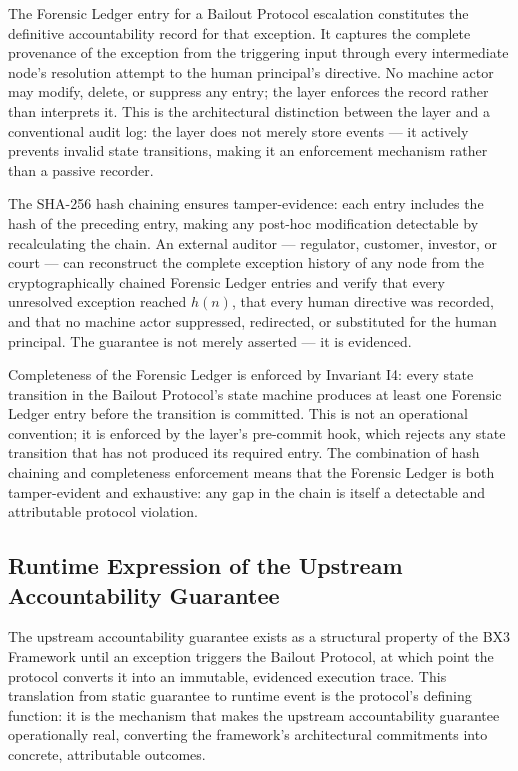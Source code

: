 The Forensic Ledger entry for a Bailout Protocol escalation constitutes the
definitive accountability record for that exception.  It captures the complete
provenance of the exception from the triggering input through every
intermediate node's resolution attempt to the human principal's directive.
No machine actor may modify, delete, or suppress any entry; the \factLayer{} layer
enforces the record rather than interprets it.  This is the architectural
distinction between the \factLayer{} layer and a conventional audit log: the
\factLayer{} layer does not merely store events --- it actively prevents invalid
state transitions, making it an enforcement mechanism rather than a passive
recorder.

The SHA-256 hash chaining ensures tamper-evidence: each entry includes the
hash of the preceding entry, making any post-hoc modification detectable by
recalculating the chain.  An external auditor --- regulator, customer,
investor, or court --- can reconstruct the complete exception history of any
node from the cryptographically chained Forensic Ledger entries and verify
that every unresolved exception reached $h(n)$, that every human directive
was recorded, and that no machine actor suppressed, redirected, or substituted
for the human principal.  The guarantee is not merely asserted --- it is
evidenced.

Completeness of the Forensic Ledger is enforced by Invariant I4: every state
transition in the Bailout Protocol's state machine produces at least one
Forensic Ledger entry before the transition is committed.  This is not an
operational convention; it is enforced by the \factLayer{} layer's pre-commit
hook, which rejects any state transition that has not produced its required
entry.  The combination of hash chaining and completeness enforcement means
that the Forensic Ledger is both tamper-evident and exhaustive: any gap in
the chain is itself a detectable and attributable protocol violation.

\subsection{Runtime Expression of the Upstream Accountability Guarantee}
\label{sec:bailout-uag}

The upstream accountability guarantee exists as a structural property of the
BX3 Framework until an exception triggers the Bailout Protocol, at which point
the protocol converts it into an immutable, evidenced execution trace.  This
translation from static guarantee to runtime event is the protocol's defining
function: it is the mechanism that makes the upstream accountability guarantee
operationally real, converting the framework's architectural commitments into
concrete, attributable outcomes.

